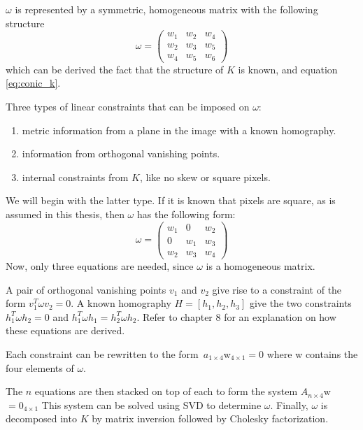 $\omega$ is represented by a symmetric, homogeneous matrix with the following structure
$$
\omega = \begin{pmatrix}
	w_{1} & w_{2} & w_{4} \\
	w_{2} & w_{3} & w_{5} \\
	w_{4} & w_{5} & w_{6} 
\end{pmatrix}
$$
which can be derived the fact that the structure of $K$ is known, and equation \ref{eq:conic_k}.

Three types of linear constraints that can be imposed on $\omega$:
\begin{enumerate}
	\item metric information from a plane in the image with a known homography.
	\item information from orthogonal vanishing points.
	\item internal constraints from $K$, like no skew or square pixels.
\end{enumerate}

We will begin with the latter type.
If it is known that pixels are square, as is assumed in this thesis, then $\omega$ has the following form:
$$
\omega = \begin{pmatrix}
	w_{1} & 0 & w_{2} \\
	0 & w_{1} & w_{3} \\
	w_{2} & w_{3} & w_{4}
\end{pmatrix}
$$
Now, only three equations are needed, since $\omega$ is a homogeneous matrix.

A pair of orthogonal vanishing points $v_1$ and $v_2$ give rise to a constraint of the form $v_{1}^T \omega v_{2} = 0$.
A known homography $H=[h_{1},h_{2},h_{3}]$ give the two constraints $h_{1}^T \omega h_{2} = 0$ and $h_{1}^T \omega h_{1} = h_{2}^T \omega h_{2}$. Refer to \cite{hartley-zisserman} chapter 8 for an explanation on how these equations are derived.

Each constraint can be rewritten to the form $a_{1 \times 4}$w$_{4 \times 1}=0$ where w contains the four elements of $\omega$.

The $n$ equations are then stacked on top of each to form the system $A_{n \times 4}$w$=0_{4 \times 1}$
This system can be solved using SVD to determine $\omega$.
Finally, $\omega$ is decomposed into $K$ by matrix inversion followed by Cholesky factorization. \cite[223-226]{hartley-zisserman}

